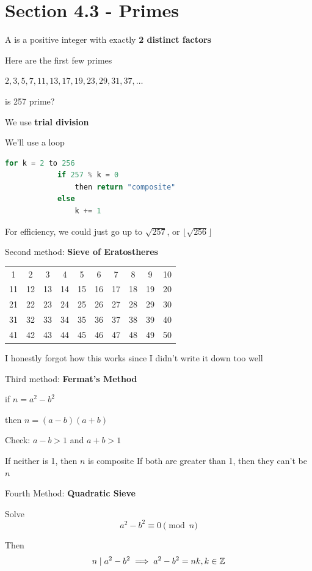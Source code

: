 \documentclass[../../Main.tex]{subfiles}
\begin{document}
\section{Section 4.3 - Primes}

\begin{definition}
    A  is a positive integer with exactly \textbf{2 distinct factors}
\end{definition}

\begin{example}
    Here are the first few primes

    $2, 3, 5, 7, 11, 13, 17, 19, 23, 29, 31, 37, \ldots$

    is 257 prime?
    
    We use \textbf{trial division}

    We'll use a loop

    \begin{lstlisting}[language=Python]
        for k = 2 to 256
            if 257 % k = 0
                then return "composite"
            else
                k += 1
    \end{lstlisting}

    For efficiency, we could just go up to $\sqrt{257}$, or $\lfloor \sqrt{256} \rfloor$

    Second method: \textbf{Sieve of Eratostheres}

    \begin{tabular}{c c c c c c c c c c}
        1 & 2 & 3 & 4 & 5 & 6 & 7 & 8 & 9 & 10 \\
        11 & 12 & 13 & 14 & 15 & 16 & 17 & 18 & 19 & 20 \\
        21 & 22 & 23 & 24 & 25 & 26 & 27 & 28 & 29 & 30 \\
        31 & 32 & 33 & 34 & 35 & 36 & 37 & 38 & 39 & 40 \\
        41 & 42 & 43 & 44 & 45 & 46 & 47 & 48 & 49 & 50 \\
    \end{tabular}

    I honestly forgot how this works since I didn't write it down too well

    Third method: \textbf{Fermat's Method}

    if $n = a^2 - b^2$

    then $n = (a - b)(a + b)$

    Check: $a - b > 1$ and $a + b > 1$

    If neither is 1, then $n$ is composite
    If both are greater than 1, then they can't be $n$

    Fourth Method: \textbf{Quadratic Sieve}

    Solve $$a^2 - b^2 \equiv 0 \pmod{n}$$

    Then $$n \mid a^2 - b^2 \implies a^2 - b^2 = nk, k \in \mathbb{Z}$$

\end{example}
\end{document}
